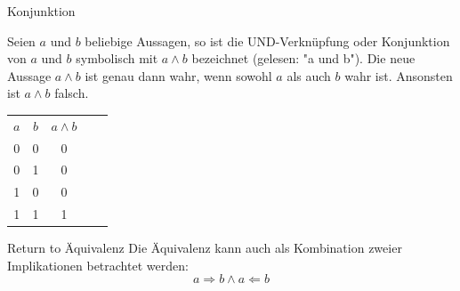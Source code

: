 \documentclass[12pt%
,aspectratio=169%
]{beamer}
\begin{document}
\begin{frame}{Konjunktion}
\begin{definition}[Konjunktion]
Seien $a$ und $b$ beliebige Aussagen, so ist die UND-Verknüpfung oder Konjunktion von $a$ und $b$ symbolisch mit $a \land b$ bezeichnet (gelesen: "a und b"). Die neue Aussage $a \land b$ ist genau dann
wahr, wenn sowohl $a$ als auch $b$ wahr ist. Ansonsten ist $a \land b$ falsch.
\begin{center}
\begin{table}[]
\begin{tabular}{|c|c|c|ll}
\cline{1-3}
$a$ & $b$ & $a \land b$ &  &  \\ \cline{1-3}
0 & 0 & 0 &  &  \\ \cline{1-3}
0 & 1 & 0 &  &  \\ \cline{1-3}
1 & 0 & 0 &  &  \\ \cline{1-3}
1 & 1 & 1 &  &  \\ \cline{1-3}
\end{tabular}
\end{table}
\end{center}
\end{definition}
\end{frame}

\begin{frame}{Return to Äquivalenz}
Die Äquivalenz kann auch als Kombination zweier Implikationen betrachtet werden:\\
$$a \Rightarrow b \land a \Leftarrow b$$
\end{frame}
\end{document}
